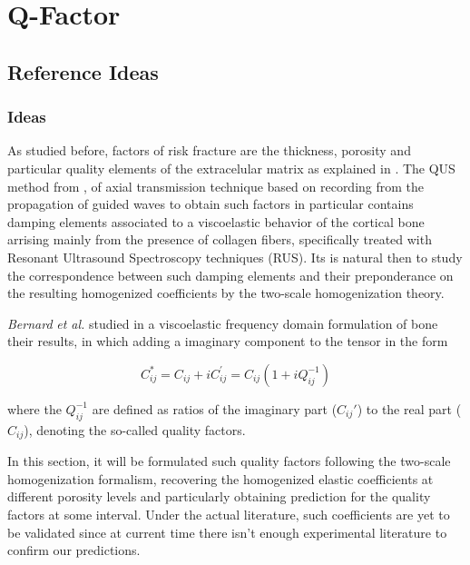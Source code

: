 \chapter{Q-Factor}
\section{Reference Ideas}



\subsection{Ideas}
As studied before, factors of risk fracture are the thickness, porosity and particular quality elements of the extracelular matrix as explained in \cite{Bernard2015}. The QUS method from \cite{Foiret2014}, \cite{Minonzio2018} of axial transmission technique based on recording from the propagation of guided waves to obtain such factors in particular contains damping elements associated to a viscoelastic behavior of the cortical bone arrising mainly from the presence of collagen fibers, specifically treated with Resonant Ultrasound Spectroscopy techniques (RUS). Its is natural then to study the correspondence between such damping elements and their preponderance on the resulting homogenized coefficients by the two-scale homogenization theory.

\textit{Bernard} \textit{et al. }\cite{Bernard2015} studied in a viscoelastic frequency domain formulation of bone their results, in which adding a imaginary component to the tensor in the form

\begin{equation*}
C^*_{ij} = C_{ij} + i C_{ij}^{'} = C_{ij} (1+ iQ_{ij}^{-1})
\end{equation*}

where the $Q^{-1}_{ij}$ are defined as ratios of the imaginary part ($C_{ij}'$) to the real part ($C_{ij}$), denoting the so-called quality factors.

In this section, it will be formulated such quality factors following the two-scale homogenization formalism, recovering the homogenized elastic coefficients at different porosity levels and particularly obtaining prediction for the quality factors at some interval. Under the actual literature, such coefficients are yet to be validated since at current time there isn't enough experimental literature to confirm our predictions.


